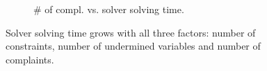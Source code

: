 \begin{figure}[t]
\begin{subfigure} [t]{.3\textwidth}
    \vspace*{-.25in}
    \caption{\# of compl. vs. solver solving time.}
    \vspace*{-.1in}
    \label{f:compl_vs_time} 
    \end{subfigure} 

   \caption{Solver solving time grows with all three factors: number of constraints, number of undermined variables and number of complaints. }
   \vspace*{-.1in}
   \label{f:soltime}
  \end{figure}
